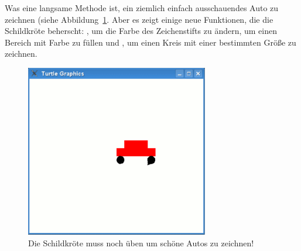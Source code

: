 \noindent
Was eine langsame Methode ist, ein ziemlich einfach ausschauendes Auto zu zeichnen (siehe Abbildung~\ref{fig24}. Aber es zeigt einige neue Funktionen, die die Schildkröte beherscht: , um die Farbe des Zeichenstifts zu ändern,  um einen Bereich mit Farbe zu füllen und , um einen Kreis mit einer bestimmten Größe zu zeichnen.

\begin{figure}
\begin{center}
\includegraphics[width=80mm]{images/figure24}
\end{center}
\caption{Die Schildkröte muss noch üben um schöne Autos zu zeichnen!}\label{fig24}
\end{figure}


